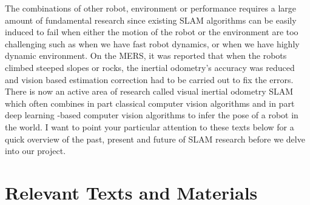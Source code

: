  The combinations of other robot, environment  or performance requires a large amount of fundamental research since existing SLAM algorithms can be easily induced to fail when either the motion of the robot or the environment are too challenging such as when we have fast robot dynamics, or when we have highly dynamic environment. On the MERS, it was reported that when the robots climbed steeped slopes or rocks, the inertial odometry's accuracy was reduced and vision based estimation correction had to be carried out to fix the errors. There is now an active area of research called visual inertial odometry SLAM which often combines in part classical computer vision algorithms and in part deep learning -based computer vision algorithms to infer the pose of a robot in the world. I want to point your particular attention to these texts below for a quick overview of the past, present and future of SLAM research before we delve into our project.


\section{Relevant Texts and Materials}

